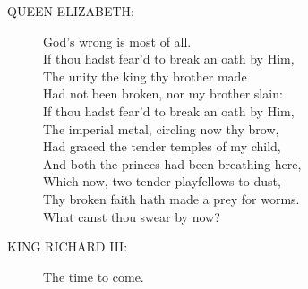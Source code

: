 \documentclass{article}
\begin{document}
\begin{description}
\item[QUEEN ELIZABETH:] 
\hspace{1pt}God's wrong is most of all.\\
\hspace{1pt}If thou hadst fear'd to break an oath by Him,\\
\hspace{1pt}The unity the king thy brother made\\
\hspace{1pt}Had not been broken, nor my brother slain:\\
\hspace{1pt}If thou hadst fear'd to break an oath by Him,\\
\hspace{1pt}The imperial metal, circling now thy brow,\\
\hspace{1pt}Had graced the tender temples of my child,\\
\hspace{1pt}And both the princes had been breathing here,\\
\hspace{1pt}Which now, two tender playfellows to dust,\\
\hspace{1pt}Thy broken faith hath made a prey for worms.\\
\hspace{1pt}What canst thou swear by now?\\
\end{description}
\begin{description}
\item[KING RICHARD III:] 
\hspace{1pt}The time to come.\\
\end{description}
\end{document}
